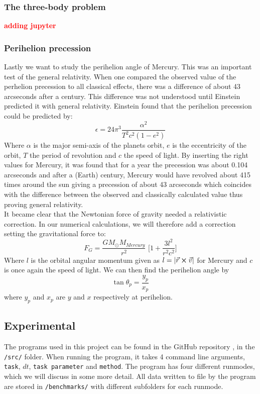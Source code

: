\documentclass{article}
\newcommand\red[1]{\textcolor{red}{\textbf{#1}}}
\newcommand{\TomH}[1]{\Big[ #1 \Big]}
\begin{document}
\subsubsection{The three-body problem}
\red{adding jupyter}

\subsubsection{Perihelion precession}
Lastly we want to study the perihelion angle of Mercury. This was an important test of the general relativity. When one compared the observed value of the perhelion precession to all classical effects, there was a difference of about 43 arcseconds after a century. This difference was not understood until Einstein predicted it with general relativity. Einstein found that the perihelion precession could be predicted by:
\begin{equation}
\epsilon = 24 \pi^3 \frac{\alpha^2}{T^2 c^2 (1 - e^2)}
\label{eq:perihelion}
\end{equation}
Where $\alpha$ is the major semi-axis of the planets orbit, $e$ is the eccentricity of the orbit, $T$ the period of revolution and $c$ the speed of light. By inserting the right values for Mercury, it was found that for a year the precession was about 0.104 arcseconds and after a (Earth) century, Mercury would have revolved about 415 times around the sun giving a precession of about 43 arcseconds which coincides with the difference between the observed and classically calculated value thus proving general relativity. \\
It became clear that the Newtonian force of gravity needed a relativistic correction. In our numerical calculations, we will therefore add a correction setting the gravitational force to:
\begin{equation}
F_G = \frac{G M_{\odot} M_{Mercury}}{r^2} \, \, \TomH{1 + \frac{3l^2}{r^2c^2}}
\label{eq:FgGR}
\end{equation}
Where $l$ is the orbital angular momentum given as $l = |\vec{r} \cross \vec{v}|$ for Mercury and $c$ is once again the speed of light.
We can then find the perihelion angle by
\begin{equation}
\tan \theta_p = \frac{y_p}{x_p}
\end{equation}
where $y_p$ and $x_p$ are $y$ and $x$ respectively at perihelion.
\subsection{Experimental}
The programs used in this project can be found in the GitHub repository \cite{Github}, in the \texttt{/src/} folder. When running the program, it takes 4 command line arguments, \texttt{task}, $dt$, \texttt{task parameter} and \texttt{method}. The program has four different runmodes, which we will discuss in some more detail. All data written to file by the program are stored in \texttt{/benchmarks/} with different subfolders for each runmode.
\end{document}
